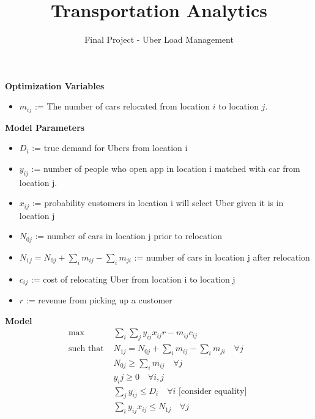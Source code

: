 \documentclass[12pt]{article}
\begin{document}
 
 
\title{Transportation Analytics}
\author{Final Project - Uber Load Management}

\maketitle

\textbf{Optimization Variables}

\begin{itemize}
\item $m_{ij}$ := The number of cars relocated from location $i$ to location $j$.
\end{itemize}

\vspace{.3 in}

\textbf{Model Parameters}
\begin{itemize}
\item $D_i$ := true demand for Ubers from location i
\item $y_{ij}$ := number of people who open app in location i matched with car from location j.
\item $x_{ij}$ := probability customers in location i will select Uber given it is in location j
\item $N_{0j}$ := number of cars in location j prior to relocation
\item $N_{1j} = N_{0j} + \sum_im_{ij} - \sum_im_{ji}$ := number of cars in location j after relocation
\item $c_{ij}$ := cost of relocating Uber from location i to location j
\item $r$ := revenue from picking up a customer
\end{itemize}

\vspace{.3 in}

\textbf{Model}
\begin{align*}
\max & \sum_i\sum_j y_{ij}x_{ij}r - m_{ij}c_{ij} \\
\text{such that      } & N_{1j} = N_{0j} + \sum_i m_{ij} - \sum_i m_{ji} \quad \forall j\\
& N_{0j}\geq \sum_i m_{ij} \quad \forall j \\
& y_ij \geq 0 \quad \forall i, j\\
& \sum_j y_{ij} \leq D_i \quad \forall i \text{   [consider equality]   }\\
& \sum_i y_{ij}x_{ij}\leq N_{1j} \quad \forall j
\end{align*}
\end{document}
